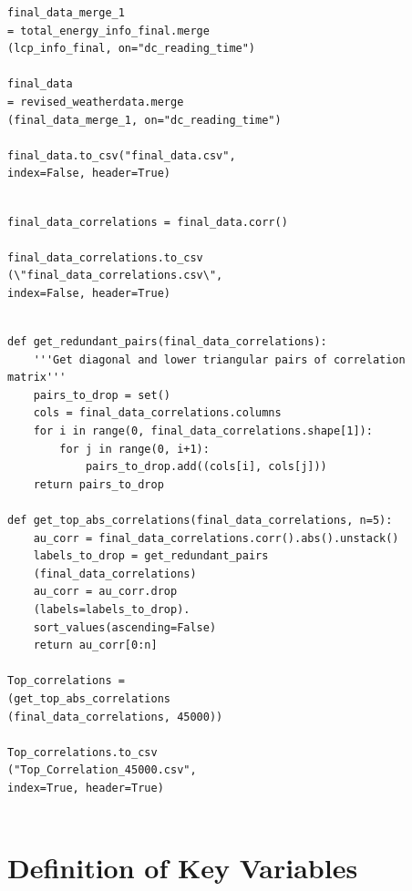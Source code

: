 \documentclass[12pt]{scrartcl}
\begin{document}
\begin{lstlisting}[frame=single,basicstyle=\footnotesize\ttfamily,
  caption={Python - Merge all Data Together into one table},label={list:[Merge all Data Together into one table]}]
final_data_merge_1 
= total_energy_info_final.merge
(lcp_info_final, on="dc_reading_time")

final_data 
= revised_weatherdata.merge
(final_data_merge_1, on="dc_reading_time")

final_data.to_csv("final_data.csv", 
index=False, header=True)


\end{lstlisting}

\begin{lstlisting}[frame=single,basicstyle=\footnotesize\ttfamily,
  caption={Python - Get Correlations between all Variables},label={list:[Get Correlations between all Variables]}]
final_data_correlations = final_data.corr()

final_data_correlations.to_csv
(\"final_data_correlations.csv\", 
index=False, header=True)


\end{lstlisting}

\begin{lstlisting}[frame=single,basicstyle=\footnotesize\ttfamily,
  caption={Python - Analyse Correlations in Python},label={list:[Analyse Correlations in Python]}]
def get_redundant_pairs(final_data_correlations):
    '''Get diagonal and lower triangular pairs of correlation matrix'''
    pairs_to_drop = set()
    cols = final_data_correlations.columns
    for i in range(0, final_data_correlations.shape[1]):
        for j in range(0, i+1):
            pairs_to_drop.add((cols[i], cols[j]))
    return pairs_to_drop
    
def get_top_abs_correlations(final_data_correlations, n=5):
    au_corr = final_data_correlations.corr().abs().unstack()
    labels_to_drop = get_redundant_pairs
    (final_data_correlations)
    au_corr = au_corr.drop
    (labels=labels_to_drop).
    sort_values(ascending=False)
    return au_corr[0:n]
    
Top_correlations = 
(get_top_abs_correlations
(final_data_correlations, 45000))

Top_correlations.to_csv
("Top_Correlation_45000.csv", 
index=True, header=True)


\end{lstlisting}

\section{Definition of Key Variables}
\label{sec:[Definition of key Variables]}
\end{document}
